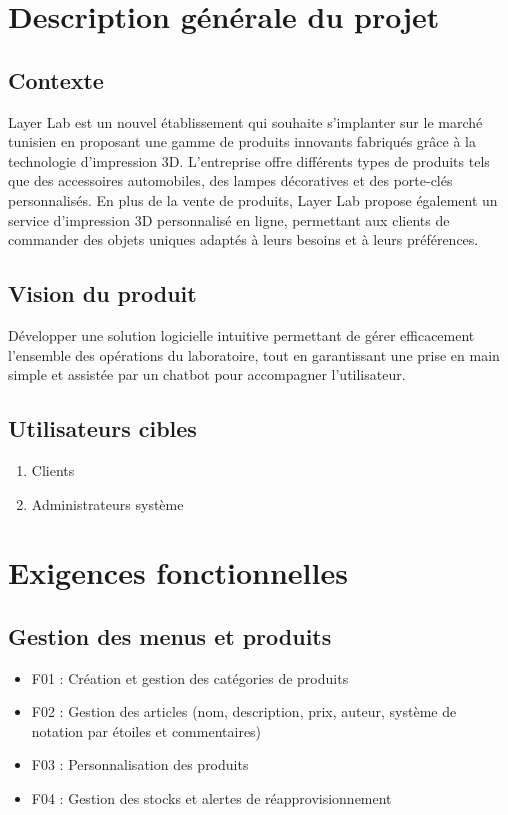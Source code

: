 \documentclass[12pt,a4paper]{article}
\begin{document}
\section{Description générale du projet}

\subsection{Contexte}

Layer Lab est un nouvel établissement qui souhaite s’implanter sur le marché tunisien en proposant une gamme de produits innovants fabriqués grâce à la technologie d’impression 3D. L’entreprise offre différents types de produits tels que des accessoires automobiles, des lampes décoratives et des porte-clés personnalisés. En plus de la vente de produits, Layer Lab propose également un service d’impression 3D personnalisé en ligne, permettant aux clients de commander des objets uniques adaptés à leurs besoins et à leurs préférences.

\subsection{Vision du produit}

Développer une solution logicielle intuitive permettant de gérer efficacement l’ensemble des opérations du laboratoire, tout en garantissant une prise en main simple et assistée par un chatbot pour accompagner l’utilisateur.

\subsection{Utilisateurs cibles}

\begin{enumerate}
\item Clients
\item Administrateurs système
\end{enumerate}

\section{Exigences fonctionnelles}

\subsection{Gestion des menus et produits}

\begin{itemize}
\item F01 : Création et gestion des catégories de produits
\item F02 : Gestion des articles (nom, description, prix, auteur, système de notation par étoiles et commentaires)
\item F03 : Personnalisation des produits
\item F04 : Gestion des stocks et alertes de réapprovisionnement
\end{itemize}
\end{document}
